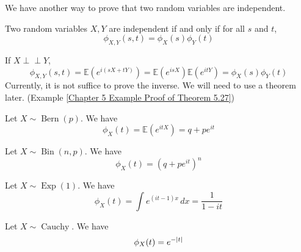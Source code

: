 \documentclass{huhtakm-template-book}
\newcommand{\independent}{\perp\!\!\!\perp}
\newcommand{\expect}{\mathbb{E}}
\DeclareMathOperator{\Bern}{Bern}
\DeclareMathOperator{\Bin}{Bin}
\DeclareMathOperator{\Exp}{Exp}
\DeclareMathOperator{\Cauchy}{Cauchy}
\begin{document}
    We have another way to prove that two random variables are independent.
    \begin{thm}
        \label{Chapter 5 Theorem Independent via CF}
        Two random variables $X,Y$ are independent if and only if for all $s$ and $t$,
        \begin{equation*}
            \phi_{X,Y}(s,t)=\phi_{X}(s)\phi_{Y}(t)
        \end{equation*}
    \end{thm}
    \begin{proofing}
        If $X\independent Y$,
        \begin{equation*}
            \phi_{X,Y}(s,t)=\expect(e^{i(sX+tY)})=\expect(e^{isX})\expect(e^{itY})=\phi_{X}(s)\phi_{Y}(t)
        \end{equation*}
        Currently, it is not suffice to prove the inverse. We will need to use a theorem later. (Example \ref{Chapter 5 Example Proof of Theorem 5.27})
    \end{proofing}
    \begin{eg}
        Let $X\sim\Bern(p)$. We have
        \begin{equation*}
            \phi_{X}(t)=\expect(e^{itX})=q+pe^{it}
        \end{equation*}
    \end{eg}
    \begin{eg}
        Let $X\sim\Bin(n,p)$. We have
        \begin{equation*}
            \phi_{X}(t)=(q+pe^{it})^{n}
        \end{equation*}
    \end{eg}
    \begin{eg}
        Let $X\sim\Exp(1)$. We have
        \begin{equation*}
            \phi_{X}(t)=\int e^{(it-1)x}\,dx=\frac{1}{1-it}
        \end{equation*}
    \end{eg}
    \begin{eg}
        Let $X\sim\Cauchy$. We have
        \begin{equation*}
            \phi_{X}(t)=e^{-\left|{t}\right|}
        \end{equation*}
    \end{eg}
\end{document}
